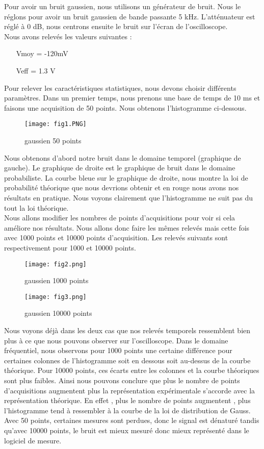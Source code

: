\documentclass[oneside,a4paper,12pt]{article}
\begin{document}
	Pour avoir un bruit gaussien, nous utilisons un générateur de bruit. Nous le réglons pour avoir un bruit gaussien de bande passante 5 kHz. L’atténuateur est réglé à 0 dB, nous centrons ensuite le bruit sur l’écran de l’oscilloscope.\\
	Nous avons relevés les valeurs suivantes :
	\begin{itemize}
		\item[Vmoy] = -120mV
		\item[Veff] = 1.3 V
	\end{itemize}
	Pour relever les caractéristiques statistiques, nous devons choisir différents paramètres. 
	Dans un premier temps, nous prenons une base de temps de 10 ms et faisons une acquisition de 50 points. Nous obtenons l’histogramme ci-dessous.\\
	
	\begin{figure}[h]
		\centering
		\texttt{[image: fig1.PNG]}
		\caption{gaussien 50 points}
	\end{figure}


	Nous obtenons d’abord notre bruit dans le domaine temporel (graphique de gauche). Le graphique de droite est le graphique de bruit dans le domaine probabiliste. La courbe bleue sur le graphique de droite, nous montre la loi de probabilité théorique que nous devrions obtenir et en rouge nous avons nos résultats en pratique. Nous voyons clairement que l’histogramme ne suit pas du tout la loi théorique.\\
	Nous allons modifier les nombres de points d’acquisitions pour voir si cela améliore nos résultats. Nous allons donc faire les mêmes relevés mais cette fois avec 1000 points et 10000 points d’acquisition. Les relevés suivants sont respectivement pour 1000 et 10000 points.
	\begin{figure}[h]
		\centering
		\texttt{[image: fig2.png]}
		\caption{gaussien 1000 points}
	\end{figure}
	\begin{figure}[h]
		\centering
		\texttt{[image: fig3.png]}
		\caption{gaussien 10000 points}
	\end{figure}

	\newpage
	Nous voyons déjà dans les deux cas que nos relevés temporels ressemblent bien plus à ce que nous pouvons observer sur l’oscilloscope. Dans le domaine fréquentiel, nous observons pour 1000 points une certaine différence pour certaines colonnes de l’histogramme soit en dessous soit au-dessus de la courbe théorique. Pour 10000 points, ces écarts entre les colonnes et la courbe théoriques sont plus faibles. Ainsi nous pouvons conclure que plus le nombre de points d’acquisitions augmentent plus la représentation expérimentale s’accorde avec la représentation théorique. En effet , plus le nombre de points augmentent , plus l'histogramme tend à ressembler à la courbe de la loi de distribution de Gauss. Avec 50 points, certaines mesures sont perdues, donc le signal est dénaturé tandis qu’avec 10000 points, le bruit est mieux mesuré donc mieux représenté dans le logiciel de mesure.\\
	
\end{document}
